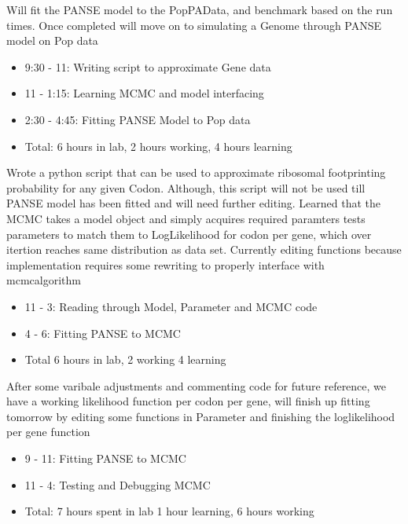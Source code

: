 \documentclass[12pt,hyperref]{labbook}
\begin{document}
Will fit the PANSE model to the PopPAData, and benchmark based on the run times. Once completed will move on to simulating a Genome through PANSE model on Pop data
\begin{itemize}
    \item 9:30 - 11: Writing script to approximate Gene data
    \item 11 - 1:15: Learning MCMC and model interfacing
    \item 2:30 - 4:45: Fitting PANSE Model to Pop data
    \item Total: 6 hours in lab, 2 hours working, 4 hours learning
\end{itemize}
Wrote a python script that can be used to approximate ribosomal footprinting probability for any given Codon. Although, this script will not be used till PANSE model has been fitted and will need further editing.
Learned that the MCMC takes a model object and simply acquires required paramters tests parameters to match them to LogLikelihood for codon per gene, which over itertion reaches same distribution as data set.
Currently editing functions because implementation requires some rewriting to properly interface with mcmcalgorithm
\begin{itemize}
    \item 11 - 3: Reading through Model, Parameter and MCMC code
    \item 4 - 6: Fitting PANSE to MCMC
    \item Total 6 hours in lab, 2 working 4 learning
\end{itemize}
After some varibale adjustments and commenting code for future reference, we have a working likelihood function per codon per gene, will finish up fitting tomorrow by editing some functions in Parameter and finishing the loglikelihood per gene function
\begin{itemize}
    \item 9 - 11: Fitting PANSE to MCMC
    \item 11 - 4: Testing and Debugging MCMC
    \item Total: 7 hours spent in lab 1 hour learning, 6 hours working
\end{itemize}
\end{document}
